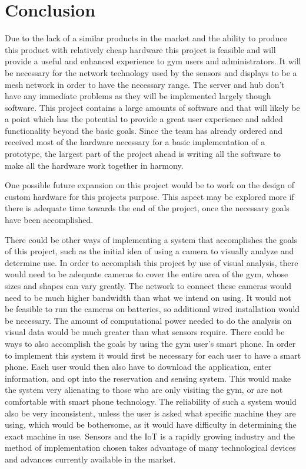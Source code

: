 \documentclass[PPFS.tex]{template/subfiles}
\begin{document}
\section{Conclusion}
Due to the lack of a similar products in the market and the ability to produce this product with relatively cheap hardware this project is feasible and will provide a useful and enhanced experience to gym users and administrators. It will be necessary for the network technology used by the sensors and displays to be a mesh network in order to have the necessary range. The server and hub don't have any immediate problems as they will be implemented largely though software. This project contains a large amounts of software and that will likely be a point which has the potential to provide a great user experience and added functionality beyond the basic goals. Since the team has already ordered and received most of the hardware necessary for a basic implementation of a prototype, the largest part of the project ahead is writing all the software to make all the hardware work together in harmony. 

One possible future expansion on this project would be to work on the design of custom hardware for this projects purpose. This aspect may be explored more if there is adequate time towards the end of the project, once the necessary goals have been accomplished. 

There could be other ways of implementing a system that accomplishes the goals of this project, such as the initial idea of using a camera to visually analyze and determine use. In order to accomplish this project by use of visual analysis, there would need to be adequate cameras to cover the entire area of the gym, whose sizes and shapes can vary greatly. The network to connect these cameras would need to be much higher bandwidth than what we intend on using. It would not be feasible to run the cameras on batteries, so additional wired installation would be necessary. The amount of computational power needed to do the analysis on visual data would be much greater than what sensors require. There could be ways to also accomplish the goals by using the gym user's smart phone. In order to implement this system it would first be necessary for each user to have a smart phone. Each user would then also have to download the application, enter information, and opt into the reservation and sensing system. This would make the system very alienating to those who are only visiting the gym, or are not comfortable with smart phone technology. The reliability of such a system would also be very inconsistent, unless the user is asked what specific machine they are using, which would be bothersome, as it would have difficulty in determining the exact machine in use. Sensors and the IoT is a rapidly growing industry and the method of implementation chosen takes advantage of many technological devices and advances currently available in the market. 
\end{document}
